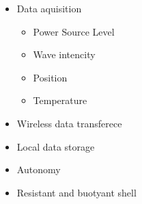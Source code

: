 \begin{itemize}
    \item Data aquisition
    \begin{itemize}
        \item Power Source Level
        \item Wave intencity
        \item Position
        \item Temperature
    \end{itemize}
    \item Wireless data transferece
    \item Local data storage
    \item Autonomy
    \item Resistant and buotyant shell
\end{itemize}





